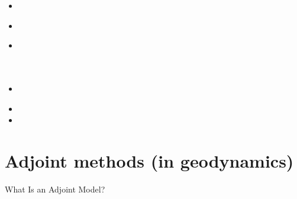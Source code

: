 \begin{scriptsize}
\begin{itemize}
\item[\twothousandeighteen] 
 \\
\item[\twothousandnineteen]
\item[\twothousandtwenty] 
 \\
 \\
 \\
\item[\twothousandtwentyone] 
 \\
\item[\twothousandtwentytwo] 
\item[\twothousandtwentythree] 
\end{itemize}
\end{scriptsize}



\section{Adjoint methods (in geodynamics)}

What Is an Adjoint Model? \cite{erri97}

